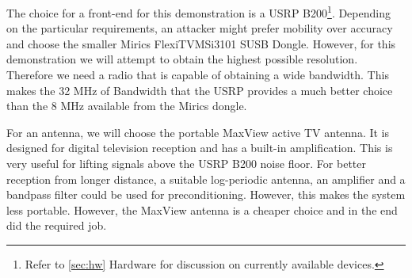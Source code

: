 \documentclass[a4paper,12pt,twoside,openright]{report}
\begin{document}
The choice for a front-end for this demonstration is a USRP B200\footnote{Refer to \ref{sec:hw} Hardware for discussion on currently available devices.}. Depending on the particular requirements, an attacker might prefer mobility over accuracy and choose the smaller Mirics FlexiTV\texttrademark MSi3101 SUSB Dongle. However, for this demonstration we will attempt to obtain the highest possible resolution. Therefore we need a radio that is capable of obtaining a wide bandwidth. This makes the 32 MHz of Bandwidth that the USRP provides a much better choice than the 8 MHz available from the Mirics dongle.

For an antenna, we will choose the portable MaxView active TV antenna. It is designed for digital television reception and has a built-in amplification. This is very useful for lifting signals above the USRP B200 noise floor. For better reception from longer distance, a suitable log-periodic antenna, an amplifier and a bandpass filter could be used for preconditioning. However, this makes the system less portable. However, the MaxView antenna is a cheaper choice and in the end did the required job.
\end{document}
